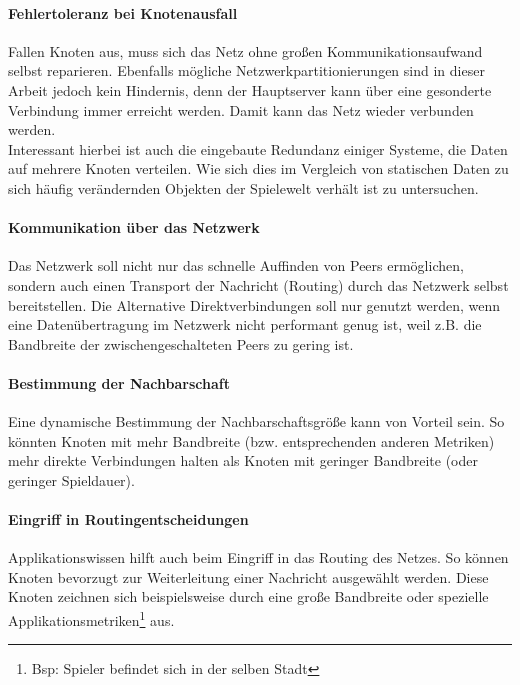 \paragraph{Fehlertoleranz bei Knotenausfall} Fallen Knoten aus, muss sich das Netz ohne großen Kommunikationsaufwand selbst reparieren. Ebenfalls mögliche Netzwerkpartitionierungen sind in dieser Arbeit jedoch kein Hindernis, denn der Hauptserver kann über eine gesonderte Verbindung immer erreicht werden. Damit kann das Netz wieder verbunden werden.\\
Interessant hierbei ist auch die eingebaute Redundanz einiger Systeme, die Daten auf mehrere Knoten verteilen. Wie sich dies im Vergleich von statischen Daten zu sich häufig verändernden Objekten der Spielewelt verhält ist zu untersuchen. 

\paragraph{Kommunikation über das Netzwerk} Das Netzwerk soll nicht nur das schnelle Auffinden von Peers ermöglichen, sondern auch einen Transport der Nachricht (Routing) durch das Netzwerk selbst bereitstellen. Die Alternative Direktverbindungen soll nur genutzt werden, wenn eine Datenübertragung im Netzwerk nicht performant genug ist, weil z.B. die Bandbreite der zwischengeschalteten Peers zu gering ist.

\paragraph{Bestimmung der Nachbarschaft} Eine dynamische Bestimmung der Nachbarschaftsgröße kann von Vorteil sein. So könnten Knoten mit mehr Bandbreite (bzw. entsprechenden anderen Metriken) mehr direkte Verbindungen halten als Knoten mit geringer Bandbreite (oder geringer Spieldauer).

\paragraph{Eingriff in Routingentscheidungen} Applikationswissen hilft auch beim Eingriff in das Routing des Netzes. So können Knoten bevorzugt zur Weiterleitung einer Nachricht ausgewählt werden. Diese Knoten zeichnen sich beispielsweise durch eine große Bandbreite oder spezielle Applikationsmetriken\footnote{Bsp: Spieler befindet sich in der selben Stadt} aus.

